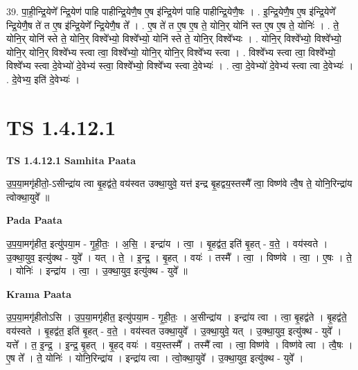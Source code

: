 \documentclass[17pt]{extarticle}
\begin{document}
39. पा॒ही॒न्द्रि॒येणे᳚ न्द्रि॒येण॑ पाहि पाहीन्द्रि॒येणै॒ष ए॒ष इ॑न्द्रि॒येण॑ पाहि पाहीन्द्रि॒येणै॒षः । . इ॒न्द्रि॒येणै॒ष ए॒ष इ॑न्द्रि॒येणे᳚ न्द्रि॒येणै॒ष ते॑ त ए॒ष इ॑न्द्रि॒येणे᳚ न्द्रि॒येणै॒ष ते᳚ । . ए॒ष ते॑ त ए॒ष ए॒ष ते॒ योनि॒र् योनि॑ स्त ए॒ष ए॒ष ते॒ योनिः॑ । . ते॒ योनि॒र् योनि॑ स्ते ते॒ योनि॒र् विश्वे᳚भ्यो॒ विश्वे᳚भ्यो॒ योनि॑ स्ते ते॒ योनि॒र् विश्वे᳚भ्यः । . योनि॒र् विश्वे᳚भ्यो॒ विश्वे᳚भ्यो॒ योनि॒र् योनि॒र् विश्वे᳚भ्य स्त्वा त्वा॒ विश्वे᳚भ्यो॒ योनि॒र् योनि॒र् विश्वे᳚भ्य स्त्वा । . विश्वे᳚भ्य स्त्वा त्वा॒ विश्वे᳚भ्यो॒ विश्वे᳚भ्य स्त्वा दे॒वेभ्यो॑ दे॒वेभ्य॑ स्त्वा॒ विश्वे᳚भ्यो॒ विश्वे᳚भ्य स्त्वा दे॒वेभ्यः॑ । . त्वा॒ दे॒वेभ्यो॑ दे॒वेभ्य॑ स्त्वा त्वा दे॒वेभ्यः॑ । . दे॒वेभ्य॒ इति॑ दे॒वेभ्यः॑ । \newline
\pagebreak
{}
\section*{ TS 1.4.12.1 }

\textbf{TS 1.4.12.1 } \newline
\textbf{Samhita Paata} \newline

उ॒प॒या॒मगृ॑हीतो॒-ऽसीन्द्रा॑य त्वा बृ॒हद्व॑ते॒ वय॑स्वत उक्था॒युवे॒ यत्त॑ इन्द्र बृ॒हद्वय॒स्तस्मै᳚ त्वा॒ विष्ण॑वे त्वै॒ष ते॒ योनि॒रिन्द्रा॑य त्वोक्था॒युवे᳚ ॥ \newline

\textbf{Pada Paata} \newline

उ॒प॒या॒मगृ॑हीत॒ इत्यु॑पया॒म - गृ॒ही॒तः॒ । अ॒सि॒ । इन्द्रा॑य । त्वा॒ । बृ॒हद्व॑त॒ इति॑ बृ॒हत् - व॒ते॒ । वय॑स्वते । उ॒क्था॒युव॒ इत्यु॑क्थ - युवे᳚ । यत् । ते॒ । इ॒न्द्र॒ । बृ॒हत् । वयः॑ । तस्मै᳚ । त्वा॒ । विष्ण॑वे । त्वा॒ । ए॒षः । ते॒ । योनिः॑ । इन्द्रा॑य । त्वा॒ । उ॒क्था॒युव॒ इत्यु॑क्थ - युवे᳚ ॥  \newline


\textbf{Krama Paata} \newline

उ॒प॒या॒मगृ॑हीतोऽसि । उ॒प॒या॒मगृ॑हीत॒ इत्यु॑पया॒म - गृ॒ही॒तः॒ । अ॒सीन्द्रा॑य । इन्द्रा॑य त्वा । त्वा॒ बृ॒हद्व॑ते । बृ॒हद्व॑ते॒ वय॑स्वते । बृ॒हद्व॑त॒ इति॑ बृ॒हत् - व॒ते॒ । वय॑स्वत उक्था॒युवे᳚ । उ॒क्था॒युवे॒ यत् । उ॒क्था॒युव॒ इत्यु॑क्थ - युवे᳚ । यत्ते᳚ । त॒ इ॒न्द्र॒ । इ॒न्द्र॒ बृ॒हत् । बृ॒हद् वयः॑ । वय॒स्तस्मै᳚ । तस्मै᳚ त्वा । त्वा॒ विष्ण॑वे । विष्ण॑वे त्वा । त्वै॒षः । ए॒ष ते᳚ । ते॒ योनिः॑ । योनि॒रिन्द्रा॑य । इन्द्रा॑य त्वा । त्वो॒क्था॒युवे᳚ । उ॒क्था॒युव॒ इत्यु॑क्थ - युवे᳚ । \newline
\end{document}
